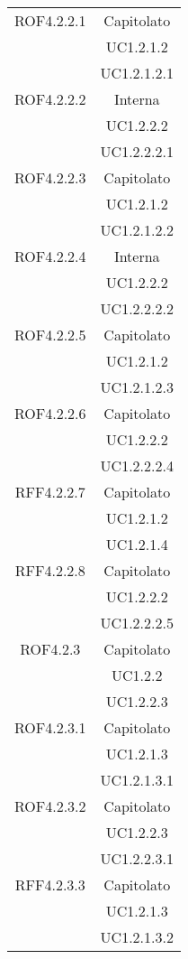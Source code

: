 \begin{longtable}{|c|c|}
\midrule
ROF4.2.2.1
& Capitolato\\
& UC1.2.1.2\\
& UC1.2.1.2.1\\

\midrule
ROF4.2.2.2
& Interna\\
& UC1.2.2.2\\
& UC1.2.2.2.1\\

\midrule
ROF4.2.2.3
& Capitolato\\
& UC1.2.1.2\\
& UC1.2.1.2.2\\

\midrule
ROF4.2.2.4
& Interna\\
& UC1.2.2.2\\
& UC1.2.2.2.2\\

\midrule
ROF4.2.2.5
& Capitolato\\
& UC1.2.1.2\\
& UC1.2.1.2.3\\

\midrule
ROF4.2.2.6
& Capitolato\\
& UC1.2.2.2\\
& UC1.2.2.2.4\\

\midrule
RFF4.2.2.7
& Capitolato\\
& UC1.2.1.2\\
& UC1.2.1.4\\

\midrule
RFF4.2.2.8
& Capitolato\\
& UC1.2.2.2\\
& UC1.2.2.2.5\\

\midrule
ROF4.2.3
& Capitolato\\
& UC1.2.2\\
& UC1.2.2.3\\

\midrule
ROF4.2.3.1
& Capitolato\\
& UC1.2.1.3\\
& UC1.2.1.3.1\\

\midrule
ROF4.2.3.2
& Capitolato\\
& UC1.2.2.3\\
& UC1.2.2.3.1\\

\midrule
RFF4.2.3.3
& Capitolato\\
& UC1.2.1.3\\
& UC1.2.1.3.2\\


\end{longtable}
